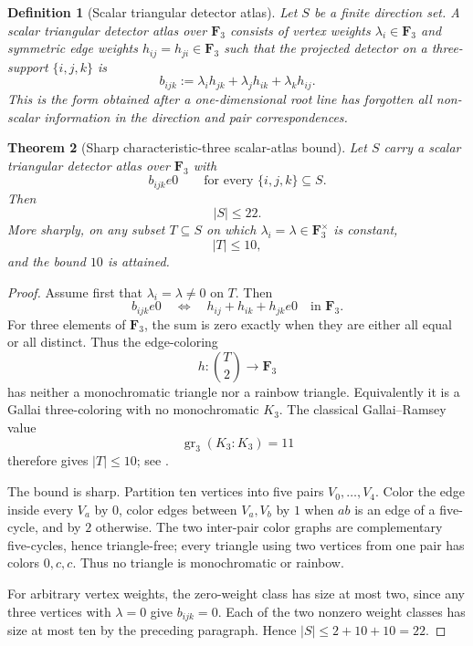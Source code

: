 \documentclass[11pt]{article}
\newtheorem{theorem}{Theorem}[section]
\newtheorem{definition}[theorem]{Definition}
\theoremstyle{remark}
\newcommand{\F}{\mathbf F}
\begin{document}
\begin{definition}[Scalar triangular detector atlas]
\label{P2M-def:scalar-detector-atlas}
Let \(S\) be a finite direction set.  A scalar triangular detector atlas over
\(\F_3\) consists of vertex weights \(\lambda_i\in\F_3\) and symmetric edge
weights \(h_{ij}=h_{ji}\in\F_3\) such that the projected detector on a
three-support \(\{i,j,k\}\) is
\[
 \boxed{
 b_{ijk}
 :=\lambda_i h_{jk}+\lambda_j h_{ik}+\lambda_k h_{ij}.}
\]
This is the form obtained after a one-dimensional root line has forgotten all
non-scalar information in the direction and pair correspondences.
\end{definition}

\begin{theorem}[Sharp characteristic-three scalar-atlas bound]
\label{P2M-thm:finite-scalar-atlas-nogo}
Let \(S\) carry a scalar triangular detector atlas over \(\F_3\) with
\[
 b_{ijk}
e0
 \qquad\text{for every }\{i,j,k\}\subseteq S.
\]
Then
\begin{equation}
 \boxed{|S|\le22.}
\end{equation}
More sharply, on any subset \(T\subseteq S\) on which
\(\lambda_i=\lambda\in\F_3^\times\) is constant,
\begin{equation}
 \boxed{|T|\le10,}
\end{equation}
and the bound \(10\) is attained.
\end{theorem}

\begin{proof}
Assume first that \(\lambda_i=\lambda\ne0\) on \(T\).  Then
\[
 b_{ijk}
e0
 \quad\Longleftrightarrow\quad
 h_{ij}+h_{ik}+h_{jk}
e0
 \quad\text{in }\F_3.
\]
For three elements of \(\F_3\), the sum is zero exactly when they are either
all equal or all distinct.  Thus the edge-coloring
\[
 h:\binom{T}{2}\longrightarrow\F_3
\]
has neither a monochromatic triangle nor a rainbow triangle.  Equivalently it
is a Gallai three-coloring with no monochromatic \(K_3\).  The classical
Gallai--Ramsey value
\[
 \operatorname{gr}_3(K_3:K_3)=11
\]
therefore gives \(|T|\le10\); see
\cite{ChungGraham1983,GyarfasSimonyi2004}.

The bound is sharp.  Partition ten vertices into five pairs
\(V_0,\ldots,V_4\).  Color the edge inside every \(V_a\) by \(0\), color
edges between \(V_a,V_b\) by \(1\) when \(ab\) is an edge of a five-cycle,
and by \(2\) otherwise.  The two inter-pair color graphs are complementary
five-cycles, hence triangle-free; every triangle using two vertices from one
pair has colors \(0,c,c\).  Thus no triangle is monochromatic or rainbow.

For arbitrary vertex weights, the zero-weight class has size at most two,
since any three vertices with \(\lambda=0\) give \(b_{ijk}=0\).  Each of the
two nonzero weight classes has size at most ten by the preceding paragraph.
Hence \(|S|\le2+10+10=22\).
\end{proof}
\end{document}
